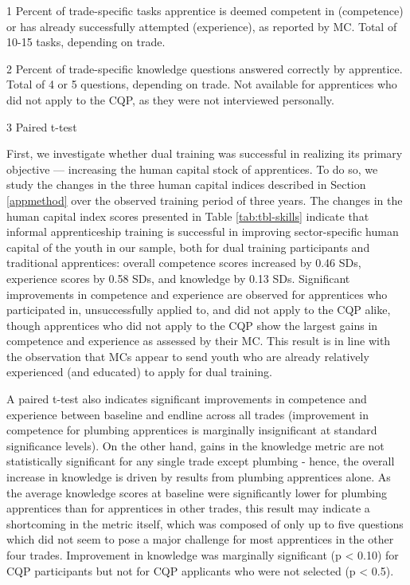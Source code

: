 \documentclass[
  11pt,
a4paper
]{report}
\begin{document}
\begin{table}[H]
{\begin{threeparttable}
\begin{tablenotes}
\item[1] Percent of trade-specific tasks apprentice is deemed competent in (competence) or has already successfully attempted (experience), as reported by MC. Total of 10-15 tasks, depending on trade.
\item[2] Percent of trade-specific knowledge questions answered correctly by apprentice. Total of 4 or 5 questions, depending on trade. Not available for apprentices who did not apply to the CQP, as they were not interviewed personally.
\item[3] Paired t-test
\end{tablenotes}
\end{threeparttable}}
\end{table}
\doublespacing

First, we investigate whether dual training was successful in realizing its primary objective --- increasing the human capital stock of apprentices. To do so, we study the changes in the three human capital indices described in Section \ref{appmethod} over the observed training period of three years. The changes in the human capital index scores presented in Table \ref{tab:tbl-skills} indicate that informal apprenticeship training is successful in improving sector-specific human capital of the youth in our sample, both for dual training participants and traditional apprentices: overall competence scores increased by 0.46 SDs, experience scores by 0.58 SDs, and knowledge by 0.13 SDs. Significant improvements in competence and experience are observed for apprentices who participated in, unsuccessfully applied to, and did not apply to the CQP alike, though apprentices who did not apply to the CQP show the largest gains in competence and experience as assessed by their MC. This result is in line with the observation that MCs appear to send youth who are already relatively experienced (and educated) to apply for dual training.

A paired t-test also indicates significant improvements in competence and experience between baseline and endline across all trades (improvement in competence for plumbing apprentices is marginally insignificant at standard significance levels). On the other hand, gains in the knowledge metric are not statistically significant for any single trade except plumbing - hence, the overall increase in knowledge is driven by results from plumbing apprentices alone. As the average knowledge scores at baseline were significantly lower for plumbing apprentices than for apprentices in other trades, this result may indicate a shortcoming in the metric itself, which was composed of only up to five questions which did not seem to pose a major challenge for most apprentices in the other four trades. Improvement in knowledge was marginally significant (p \textless{} 0.10) for CQP participants but not for CQP applicants who were not selected (p \textless{} 0.5).
\end{document}
